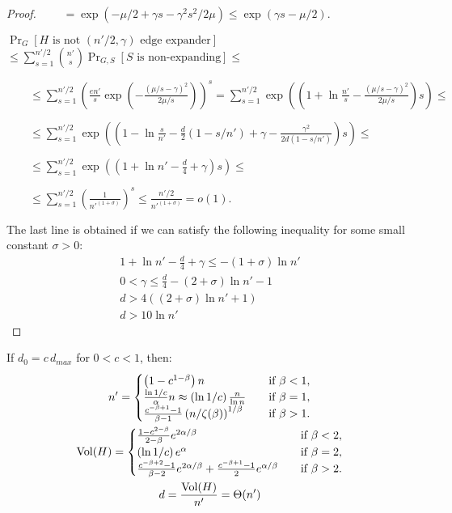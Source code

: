 \begin{proof}
    $\qquad=\exp(-\mu/2+\gamma s-\gamma^2s^2/2\mu)\leq\exp(\gamma s-\mu/2)$.
    
    $\Pr_G[H\text{ is not }(n'/2,\gamma)\text{ edge expander}]$
    $\leq\sum_{s=1}^{n'/2}{\binom{n'}{s}\Pr_{G,S}[S\text{ is non-expanding}]}\leq$
    
    $\qquad\leq\sum_{s=1}^{n'/2}{\left(\frac{en'}{s}\exp\left(-\frac{(\mu/s-\gamma)^2}{2\mu/s}\right)\right)^s}
    =\sum_{s=1}^{n'/2}{\exp\left(\left(1+\ln\frac{n'}{s}-\frac{(\mu/s-\gamma)^2}{2\mu/s}\right)s\right)}\leq$
    
    $\qquad\leq\sum_{s=1}^{n'/2}{\exp\left(\left(
        1
        -\ln\frac{s}{n'}
        -\frac{d}{2}\left(1-s/n'\right)
        +\gamma
        -\frac{\gamma^2}{2d\left(1-s/n'\right)}
    \right)s\right)}\leq$
    
    $\qquad\leq\sum_{s=1}^{n'/2}{\exp\left(\left(
        1+\ln n'
        -\frac{d}{4}
        +\gamma
    \right)s\right)}\leq$
    
    $\qquad\leq\sum_{s=1}^{n'/2}{\left(\frac{1}{n'^{(1+\sigma)}}\right)^s}\leq\frac{n'/2}{n'^{(1+\sigma)}}=o(1).$
    
    The last line is obtained if we can satisfy the following inequality
    for some small constant $\sigma>0$:
    \begin{gather*}
        1+\ln n'-\frac{d}{4}+\gamma\leq-(1+\sigma)\ln n'\\
        0<\gamma\leq\frac{d}{4}-(2+\sigma)\ln n'-1\\
        d>4\left((2+\sigma)\ln n'+1\right)\\
        d>10\ln n'
    \end{gather*}
\end{proof}

\begin{lemma}
    \label{lem:powerlaw-coin-toss-size-vol-of-h}
    If $d_0=c\,d_{max}$ for $0<c<1$, then:
    \begin{gather}
        n'=
        \begin{cases}
            \left(1-c^{1-\beta}\right)n & \quad \text{if } \beta<1,\\
            \frac{\ln 1/c}{\alpha}n\approx\left(\ln 1/c\right)\frac{n}{\ln n} & \quad \text{if } \beta=1,\\
            \frac{c^{-\beta+1}-1}{\beta-1}\left(n/\zeta(\beta)\right)^{1/\beta} & \quad \text{if } \beta>1. %
        \end{cases}\\
        \Vol(H)=
        \begin{cases}
            \frac{1-c^{2-\beta}}{2-\beta}e^{2\alpha/\beta} & \quad \text{if } \beta<2,\\
            \left(\ln 1/c\right)e^\alpha & \quad \text{if } \beta=2,\\
            \frac{c^{-\beta+2}-1}{\beta-2}e^{2\alpha/\beta}+\frac{c^{-\beta+1}-1}{2}e^{\alpha/\beta} & \quad \text{if } \beta>2.
        \end{cases}\\
        d=\frac{\Vol(H)}{n'}=\Theta(n')
    \end{gather}
\end{lemma}

